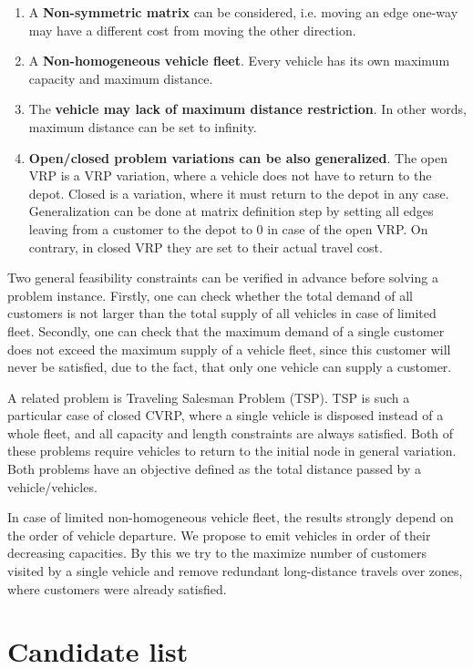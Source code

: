 \documentclass[11pt,a4paper,oneside]{book}
\begin{document}
\begin{enumerate}
\item A \textbf{Non-symmetric matrix} can be considered, i.e. moving an edge one-way may have a different cost from moving the other direction.
\item A \textbf{Non-homogeneous vehicle fleet}. Every vehicle has its own maximum capacity and maximum distance.
\item The \textbf{vehicle may lack of maximum distance restriction}. In other words, maximum distance can be set to infinity.
\item \textbf{Open/closed problem variations can be also generalized}. The open VRP is a VRP variation, where a vehicle does not have to return to the depot. Closed is a variation, where it must return to the depot in any case. Generalization can be done at matrix definition step by setting all edges leaving from a customer to the depot to 0 in case of the open VRP. On contrary, in closed VRP they are set to their actual travel cost.
\end{enumerate}

Two general feasibility constraints can be verified in advance before solving a problem instance. Firstly, one can check whether the total demand of all customers is not larger than the total supply of all vehicles in case of limited fleet. Secondly, one can check that the maximum demand of a single customer does not exceed the maximum supply of a vehicle fleet, since this customer will never be satisfied, due to the fact, that only one vehicle can supply a customer.

A related problem is Traveling Salesman Problem (TSP). TSP is such a particular case of closed CVRP, where a single vehicle is disposed instead of a whole fleet, and all capacity and length constraints are always satisfied. Both of these problems require vehicles to return to the initial node in general variation. Both problems have an objective defined as the total distance passed by a vehicle/vehicles.

In case of limited non-homogeneous vehicle fleet, the results strongly depend on the order of vehicle departure. We propose to emit vehicles in order of their decreasing capacities. By this we try to the maximize number of customers visited by a single vehicle and remove redundant long-distance travels over zones, where customers were already satisfied.

\section{Candidate list}
\end{document}
